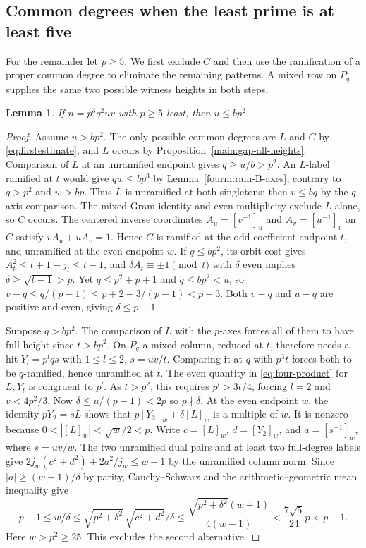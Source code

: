 \documentclass[11pt,a4paper]{article}
\numberwithin{equation}{section}
\newtheorem{lemma}[theorem]{Lemma}
\theoremstyle{remark}
\begin{document}
\subsection{Common degrees when the least prime is at least five}\label{fam:M:sec:12.1}
For the remainder let $p\ge5$. We first exclude $C$ and then use the
ramification of a proper common degree to eliminate the remaining
patterns. A mixed row on $P_q$ supplies the same two possible witness
heights in both steps.
\begin{lemma}\label{fam:M:12.4}\label{nov:lessbp2}
If $n=p^3q^2uv$ with $p\ge5$ least, then $u\le bp^2$.
\end{lemma}
\begin{proof}
Assume $u>bp^2$. The only possible common degrees are $L$ and $C$
by \eqref{eq:firstestimate}, and $L$ occurs by Proposition~\ref{main:gap-all-heights}.
Comparison of $L$ at an unramified endpoint gives $q\ge u/b>p^2$.
An $L$-label ramified at $t$ would give $qw\le bp^3$ by
Lemma~\ref{fourm:ram-B-axes}, contrary to $q>p^2$ and $w>bp$.
Thus $L$ is unramified at both
singletons; then $v\le bq$ by the $q$-axis comparison. The mixed
Gram identity and even multiplicity exclude $L$ alone, so $C$ occurs.
The centered inverse coordinates $A_u=[v^{-1}]_u$ and $A_v=[u^{-1}]_v$
on $C$ satisfy $vA_u+uA_v=1$. Hence $C$ is ramified at the odd
coefficient endpoint $t$, and unramified at the even endpoint $w$.
If $q\le bp^2$, its orbit cost gives $A_t^2\le t+1-j_t\le t-1$,
and $\delta A_t\equiv\pm1\pmod t$ with $\delta$ even implies
$\delta\ge\sqrt{t-1}>p$. Yet $q\le p^2+p+1$ and
$q\le bp^2<u$, so
$v-q\le q/(p-1)\le p+2+3/(p-1)<p+3$.
Both $v-q$ and $u-q$ are positive and even, giving $\delta\le p-1$.

Suppose $q>bp^2$. The comparison of $L$ with the $p$-axes forces
all of them to have full height since $t>b p^2$. On $P_q$ a mixed
column, reduced at $t$, therefore needs a hit $Y_l=p^lqs$ with
$1\le l\le2$, $s=uv/t$. Comparing it at $q$ with $p^3t$
forces both to be $q$-ramified, hence unramified at $t$. The even
quantity in \eqref{eq:four-product} for $L,Y_l$ is congruent to
$p^l$. As $t>p^2$, this requires $p^l>3t/4$, forcing $l=2$ and
$v<4p^2/3$. Now $\delta\le u/(p-1)<2p$ so $p\nmid\delta$.
At the even endpoint $w$, the identity $pY_2=sL$ shows that
$p[Y_2]_w\pm\delta[L]_w$ is a multiple of $w$. It is nonzero
because $0<|[L]_w|<\sqrt w/2<p$. Write $c=[L]_w$, $d=[Y_2]_w$, and $a=[s^{-1}]_w$, where $s=uv/w$.
The two unramified dual pairs and at least two full-degree labels give
$2j_w(c^2+d^2)+2a^2/j_w\le w+1$ by the unramified column norm.
Since $|a|\ge(w-1)/\delta$ by parity, Cauchy--Schwarz and the arithmetic--geometric mean inequality give
\[
 p-1\le w/\delta
 \le \sqrt{p^2+\delta^2}\,\sqrt{c^2+d^2}/\delta
 \le \frac{\sqrt{p^2+\delta^2}(w+1)}{4(w-1)}
 <\frac{7\sqrt5}{24}p<p-1.
\]
Here $w>p^2\ge25$. This excludes the second alternative.
\end{proof}
\end{document}
